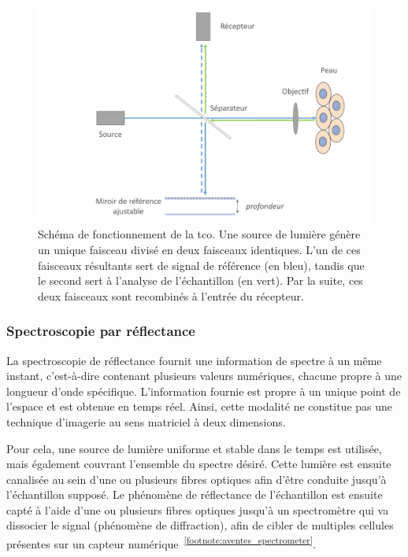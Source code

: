 \begin{figure}[H]
    \centering
    \includegraphics[width=1\linewidth]{contents/chapter_2/resources/scheme_principle_oct.pdf}
    \caption{Schéma de fonctionnement de la \gls{tco}. Une source de lumière génère un unique faisceau divisé en deux faisceaux identiques. L'un de ces faisceaux résultants sert de signal de référence (en bleu), tandis que le second sert à l'analyse de l'échantillon (en vert). Par la suite, ces deux faisceaux sont recombinés à l'entrée du récepteur.}
    \label{fig:scheme_principle_oct}
\end{figure}\par
\clearpage

\subsubsection{Spectroscopie par réflectance}
La spectroscopie de réflectance fournit une information de spectre à un même instant, c’est-à-dire contenant plusieurs valeurs numériques, chacune propre à une longueur d'onde spécifique. L'information fournie est propre à un unique point de l'espace et est obtenue en temps réel. Ainsi, cette modalité ne constitue pas une technique d'imagerie au sens matriciel à deux dimensions.\par

Pour cela, une source de lumière uniforme et stable dans le temps est utilisée, mais également couvrant l'ensemble du spectre désiré. Cette lumière est ensuite canalisée au sein d'une ou plusieurs fibres optiques afin d'être conduite jusqu'à l'échantillon supposé. Le phénomène de réflectance de l'échantillon est ensuite capté à l'aide d'une ou plusieurs fibres optiques jusqu'à un spectromètre qui va dissocier le signal (phénomène de diffraction), afin de cibler de multiples cellules présentes sur un capteur numérique~\cite{Murphy2005,Mallia2008}\textsuperscript{\ref{footnote:aventes_spectrometer}}.\par

